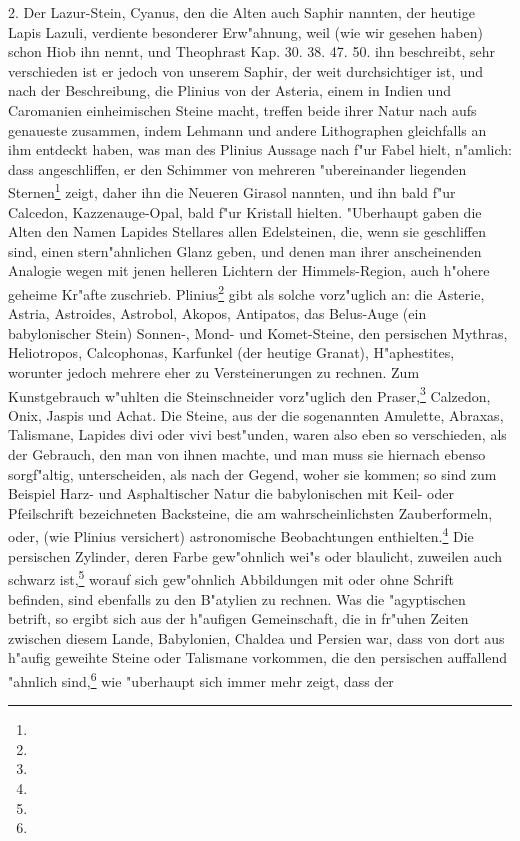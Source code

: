\documentclass[a4paper, 11pt, oneside, polutonikogreek, german]{article}
\begin{document}
2. Der Lazur-Stein, Cyanus, den die Alten auch Saphir nannten, der heutige Lapis Lazuli, verdiente besonderer Erw"ahnung, weil (wie wir gesehen haben) schon Hiob ihn nennt, und Theophrast Kap. 30. 38. 47. 50. ihn beschreibt, sehr verschieden ist er jedoch von unserem Saphir, der weit durchsichtiger ist, und nach der Beschreibung, die Plinius von der Asteria, einem in Indien und Caromanien einheimischen Steine macht, treffen beide ihrer Natur nach aufs genaueste zusammen, indem Lehmann und andere Lithographen gleichfalls an ihm entdeckt haben, was man des Plinius Aussage nach f"ur Fabel hielt, n"amlich: dass angeschliffen, er den Schimmer von mehreren "ubereinander liegenden Sternen\footnote{} zeigt, daher ihn die Neueren Girasol nannten, und ihn bald f"ur Calcedon, Kazzenauge-Opal, bald f"ur Kristall hielten. "Uberhaupt gaben die Alten den Namen Lapides Stellares allen Edelsteinen, die, wenn sie geschliffen sind, einen stern"ahnlichen Glanz geben, und denen man ihrer anscheinenden Analogie wegen mit jenen helleren Lichtern der Himmels-Region, auch h"ohere geheime Kr"afte zuschrieb. Plinius\footnote{} gibt als solche vorz"uglich an: die Asterie, Astria, Astroides, Astrobol, Akopos, Antipatos, das Belus-Auge (ein babylonischer Stein) Sonnen-, Mond- und Komet-Steine, den persischen Mythras, Heliotropos, Calcophonas, Karfunkel (der heutige Granat), H"aphestites, worunter jedoch mehrere eher zu Versteinerungen zu rechnen. Zum Kunstgebrauch w"uhlten die Steinschneider vorz"uglich den Praser,\footnote{} Calzedon, Onix, Jaspis und Achat. Die Steine, aus der die sogenannten Amulette, Abraxas, Talismane, Lapides divi oder vivi best"unden, waren also eben so verschieden, als der Gebrauch, den man von ihnen machte, und man muss sie hiernach ebenso sorgf"altig, unterscheiden, als nach der Gegend, woher sie kommen; so sind zum Beispiel Harz- und Asphaltischer Natur die babylonischen mit Keil- oder Pfeilschrift bezeichneten Backsteine, die am wahrscheinlichsten Zauberformeln, oder, (wie Plinius versichert) astronomische Beobachtungen enthielten.\footnote{} Die persischen Zylinder, deren Farbe gew"ohnlich wei"s oder blaulicht, zuweilen auch schwarz ist,\footnote{} worauf sich gew"ohnlich Abbildungen mit oder ohne Schrift befinden, sind ebenfalls zu den B"atylien zu rechnen. Was die "agyptischen betrift, so ergibt sich aus der h"aufigen Gemeinschaft, die in fr"uhen Zeiten zwischen diesem Lande, Babylonien, Chaldea und Persien war, dass von dort aus h"aufig geweihte Steine oder Talismane vorkommen, die den persischen auffallend "ahnlich sind,\footnote{} wie "uberhaupt sich immer mehr zeigt, dass der 
\end{document}
